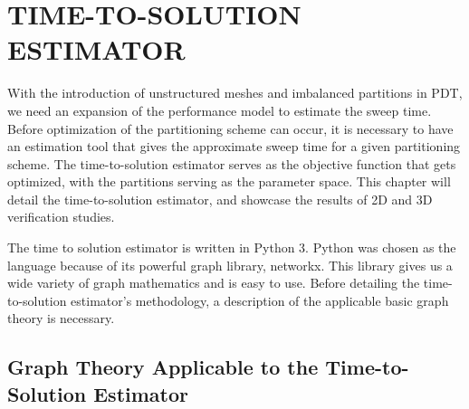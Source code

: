 %
%
%
%
 \setcounter{MaxMatrixCols}{30}
\newcommand{\tcr}[1]{\textcolor{red}{#1}}


\chapter{TIME-TO-SOLUTION ESTIMATOR \label{cha:tts}}
With the introduction of unstructured meshes and imbalanced partitions in PDT, we need an expansion of the performance model to estimate the sweep time. 
Before optimization of the partitioning scheme can occur, it is necessary to have an estimation tool that gives the approximate sweep time for a given partitioning scheme. 
The time-to-solution estimator serves as the objective function that gets optimized, with the partitions serving as the parameter space. This chapter will detail the time-to-solution estimator, and showcase the results of 2D and 3D verification studies. 

The time to solution estimator is written in Python 3. Python was chosen as the language because of its powerful graph library, networkx. 
This library gives us a wide variety of graph mathematics and is easy to use. 
Before detailing the time-to-solution estimator's methodology, a description of the applicable basic graph theory is necessary. 

\section{Graph Theory Applicable to the Time-to-Solution Estimator}

